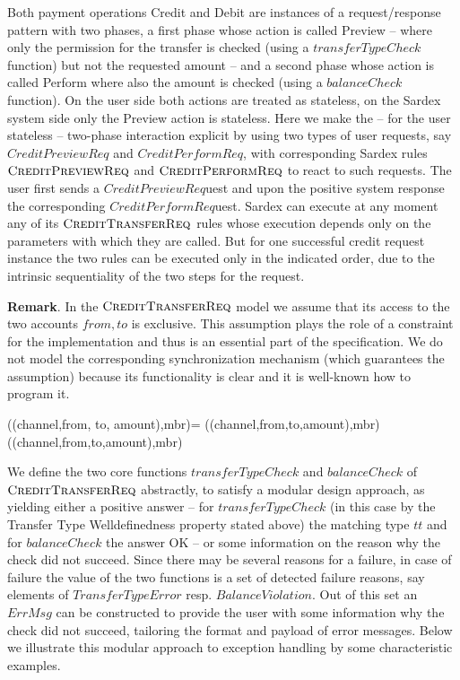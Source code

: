 Both payment operations Credit and Debit are instances of a request/response pattern with two phases, a first phase whose action is called Preview -- where only the permission for the transfer is checked (using a $transferTypeCheck$ function) but not the requested amount -- and  a second phase whose action is called Perform where also the amount is checked (using a $balanceCheck$ function). On the user side both actions are treated as stateless, on the Sardex system side only the Preview action is stateless. Here we make the -- for the user stateless -- two-phase interaction explicit by using two  types of user requests, say $CreditPreviewReq$ and $CreditPerformReq$, with corresponding Sardex rules $\hbox{\sc CreditPreviewReq}$ and $\hbox{\sc CreditPerformReq}$ to react to such requests. The user first sends a $CreditPreviewReq$uest and upon the positive system response the corresponding $CreditPerformReq$uest. Sardex can execute at any moment any of its $\hbox{\sc CreditTransferReq}$ rules whose execution depends only on the parameters with which they are called. But for one successful credit request instance the two rules can be executed only in the indicated order, due to the intrinsic sequentiality of the two steps for the request.

{\bf Remark}. In the $\hbox{\sc CreditTransferReq}$ model we assume that its access to the two accounts $from, to$ is exclusive. This assumption plays the role of a constraint for the implementation and thus is an essential part of the specification. We do not model the corresponding synchronization mechanism (which guarantees the assumption) because its functionality is clear and it is well-known how to program it. 

\begin{asm}
((channel,from, to, amount),mbr)=\+
   ((channel,from,to,amount),mbr)  \\
   ((channel,from,to,amount),mbr) 
\end{asm}


We define the two core functions $transferTypeCheck$ and $balanceCheck$ of $\hbox{\sc CreditTransferReq}$ abstractly, to satisfy a modular design approach, as yielding either a positive answer -- for $transferTypeCheck$ (in this case by the Transfer Type Welldefinedness property stated above) the matching type $tt$ and for $balanceCheck$  the answer OK -- or some information on the reason why the check did not succeed. Since there may be several reasons for a failure, in case of failure the value of the two functions is a set of detected failure reasons, say elements of $TransferTypeError$ resp. $BalanceViolation$.  Out of this set an $ErrMsg$ can be constructed to provide the user with some information why the check did not succeed, tailoring the format and payload of error messages.  Below we illustrate this modular approach to exception handling by some characteristic examples.


